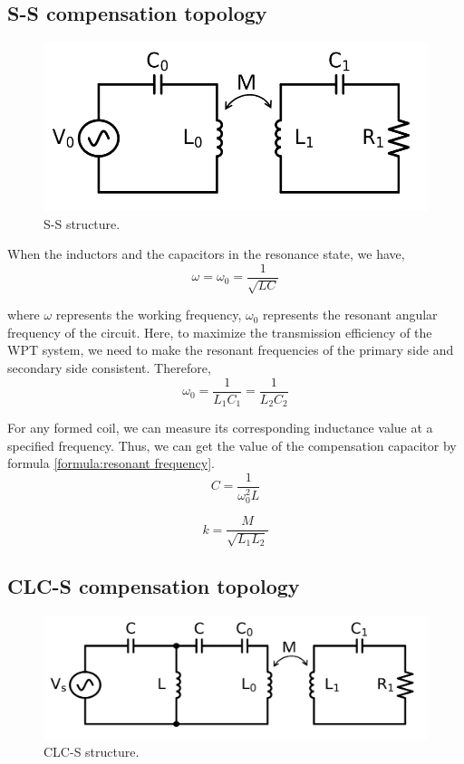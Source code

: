 \subsection{S-S compensation topology}

\begin{figure}[htbp]
    \centering
    \includegraphics[width=0.7\linewidth]{images/2_SS_topology.png}
    \caption{S-S structure.}
    \label{fig:ss topology}
\end{figure}

When the inductors and the capacitors in the resonance state, we have,
\begin{equation}
    \omega=\omega _0=\frac{1}{\sqrt{LC}}
    \label{formula:resonant frequency}
\end{equation}

where $\omega$ represents the working frequency, $\omega _0$ represents the resonant angular frequency of the circuit. Here, to maximize the transmission efficiency of the WPT system, we need to make the resonant frequencies of the primary side and secondary side consistent. Therefore,
\begin{equation}
    \omega _0 = \frac{1}{L_1C_1} = \frac{1}{L_2C_2}
\end{equation}

For any formed coil, we can measure its corresponding inductance value at a specified frequency. Thus, we can get the value of the compensation capacitor by formula \ref{formula:resonant frequency}.
\begin{equation}
    C = \frac{1}{\omega_0^2 L}
\end{equation}


\begin{equation}
    k=\frac{M}{\sqrt{L_1L_2}}
\end{equation}


\subsection{CLC-S compensation topology}
\begin{figure}[htbp]
    \centering
    \includegraphics[width=0.93\linewidth]{images/2_CLCS_topology.png}
    \caption{CLC-S structure.}
    \label{fig:clcs topology}
\end{figure}


